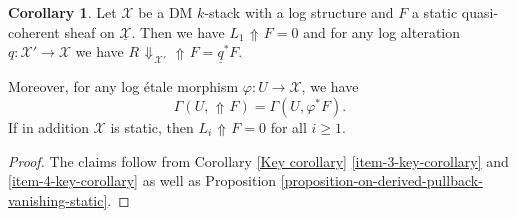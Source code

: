 \documentclass[11pt]{amsart}
\theoremstyle{definition}
\theoremstyle{definition}
\newtheorem{corollary}[theorem]{Corollary}
\DeclareMathOperator{\arrowup}{\!\Uparrow \!}
\DeclareMathOperator{\arrowdown}{\!\Downarrow\!}
\newcommand{\cX}{\mathcal{X}}
\newcommand{\ul}[1]{\underline{#1}}
\newcommand{\cal}{\mathcal}
\def\cX{{\cal X}}
\begin{document}
\begin{corollary}\label{corollary-DM-stacks-static-pullback}
Let $\mathcal{X}$ be a DM $k$-stack with a log structure and $F$ a static quasi-coherent sheaf on $\ul{\mathcal{X}}$. Then we have $L_1\arrowup F=0 $ and for any log alteration $q\colon \cX'\rightarrow \cX$ we have $R\arrowdown_{\mathcal{X}'} \arrowup F=\ul{q}^*F$.

Moreover, for any log \'etale morphism $\varphi\colon U\rightarrow \mathcal{X}$, we have 
\[\Gamma(U,\arrowup F)=\Gamma(U,\varphi^{*} F).\]
If in addition $\mathcal{X}$ is static, then $L_{i}\arrowup {F}=0$ for all $i\geq 1$.
\end{corollary}
\begin{proof}
The claims follow from Corollary \ref{Key corollary} \eqref{item-3-key-corollary} and \eqref{item-4-key-corollary} as well as Proposition \ref{proposition-on-derived-pullback-vanishing-static}.
\end{proof}
\end{document}
